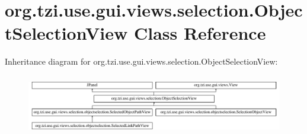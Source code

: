 \hypertarget{classorg_1_1tzi_1_1use_1_1gui_1_1views_1_1selection_1_1_object_selection_view}{\section{org.\-tzi.\-use.\-gui.\-views.\-selection.\-Object\-Selection\-View Class Reference}
\label{classorg_1_1tzi_1_1use_1_1gui_1_1views_1_1selection_1_1_object_selection_view}
}
Inheritance diagram for org.\-tzi.\-use.\-gui.\-views.\-selection.\-Object\-Selection\-View\-:\begin{figure}[H]
\begin{center}
\leavevmode
\includegraphics[height=2.660333cm]{classorg_1_1tzi_1_1use_1_1gui_1_1views_1_1selection_1_1_object_selection_view}
\end{center}
\end{figure}
